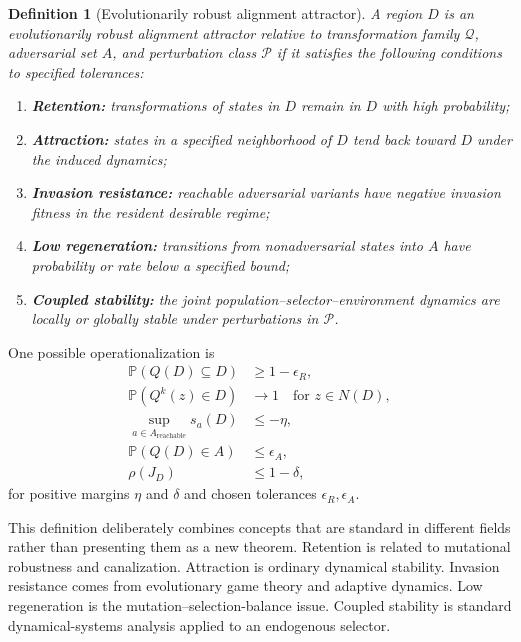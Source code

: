 \documentclass[11pt]{article}
\newtheorem{definition}{Definition}
\newcommand{\Prb}{\mathbb{P}}
\newcommand{\Q}{\mathcal{Q}}
\begin{document}
\begin{definition}[Evolutionarily robust alignment attractor]
A region $D$ is an evolutionarily robust alignment attractor relative to transformation family $\Q$, adversarial set $A$, and perturbation class $\mathcal{P}$ if it satisfies the following conditions to specified tolerances:
\begin{enumerate}[label=(\roman*)]
    \item \textbf{Retention:} transformations of states in $D$ remain in $D$ with high probability;
    \item \textbf{Attraction:} states in a specified neighborhood of $D$ tend back toward $D$ under the induced dynamics;
    \item \textbf{Invasion resistance:} reachable adversarial variants have negative invasion fitness in the resident desirable regime;
    \item \textbf{Low regeneration:} transitions from nonadversarial states into $A$ have probability or rate below a specified bound;
    \item \textbf{Coupled stability:} the joint population--selector--environment dynamics are locally or globally stable under perturbations in $\mathcal{P}$.
\end{enumerate}
\end{definition}

One possible operationalization is
\begin{align}
    \Prb(Q(D)\subseteq D)&\ge 1-\epsilon_R,\\
    \Prb(Q^k(z)\in D)&\rightarrow 1 \quad \text{for }z\in N(D),\\
    \sup_{a\in A_{\mathrm{reachable}}}s_a(D)&\le -\eta,\\
    \Prb(Q(D)\in A)&\le\epsilon_A,\\
    \rho(J_D)&\le 1-\delta,
    \label{eq:attractor-criteria}
\end{align}
for positive margins $\eta$ and $\delta$ and chosen tolerances $\epsilon_R,\epsilon_A$.

This definition deliberately combines concepts that are standard in different fields rather than presenting them as a new theorem. Retention is related to mutational robustness and canalization. Attraction is ordinary dynamical stability. Invasion resistance comes from evolutionary game theory and adaptive dynamics. Low regeneration is the mutation--selection-balance issue. Coupled stability is standard dynamical-systems analysis applied to an endogenous selector.
\end{document}
